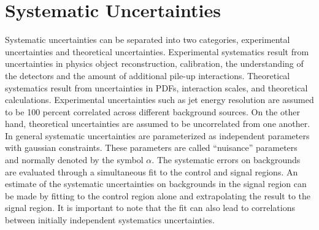 
\chapter{Systematic Uncertainties}
\label{chap:Uncertainties}

\indent Systematic uncertainties can be separated into two categories, experimental uncertainties and theoretical uncertainties.  Experimental systematics result from uncertainties in physics object reconstruction, calibration, the understanding of the detectors and the amount of additional pile-up interactions.  Theoretical systematics result from uncertainties in PDFs, interaction scales, and theoretical calculations. Experimental uncertainties such as jet energy resolution are assumed to be 100 percent correlated across different background sources.  On the other hand, theoretical uncertainties are assumed to be uncorrelated from one another.  \\

\indent In general systematic uncertainties are parameterized as independent parameters with gaussian constraints.  These parameters are called ``nuisance'' parameters and normally denoted by the symbol $\alpha$.  The systematic errors on backgrounds are evaluated through a simultaneous fit to the control and signal regions.  An estimate of the systematic uncertainties on backgrounds in the signal region can be made by fitting to the control region alone and extrapolating the result to the signal region.  It is important to note that the fit can also lead to correlations between initially independent systematics uncertainties. \\



